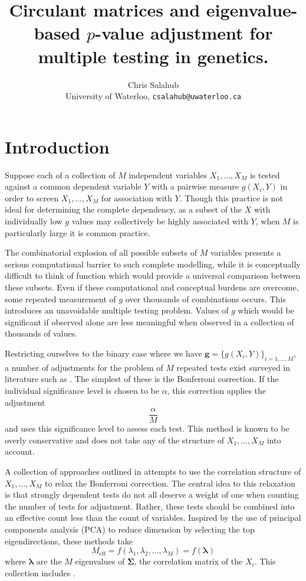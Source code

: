 \documentclass[letterpaper,12pt,oneside,final]{article}
\title{Circulant matrices and eigenvalue-based $p$-value adjustment for multiple testing in genetics.}
\author{Chris Salahub \\ {\footnotesize University of Waterloo, \texttt{csalahub@uwaterloo.ca}}}
\newcommand{\ve}[1]{\mathbf{#1}}           %
\newcommand{\sv}[1]{\boldsymbol{#1}}   %
\newcommand{\sm}[1]{\boldsymbol{#1}}   %
\begin{document}
\maketitle

\section{Introduction}

Suppose each of a collection of $M$ independent variables $X_1, \dots, X_M$ is tested against a common dependent variable $Y$ with a pairwise measure $g(X_i, Y)$ in order to screen $X_1, \dots, X_M$ for association with $Y$. Though this practice is not ideal for determining the complete dependency, as a subset of the $X$ with individually low $g$ values may collectively be highly associated with $Y$, when $M$ is particularly large it is common practice.

The combinatorial explosion of all possible subsets of $M$ variables presents a serious computational barrier to such complete modelling, while it is conceptually difficult to think of function which would provide a universal comparison between these subsets. Even if these computational and conceptual burdens are overcome, some repeated measurement of $g$ over thousands of combinations occurs. This introduces an unavoidable multiple testing problem. Values of $g$ which would be significant if observed alone are less meaningful when observed in a collection of thousands of values.

Restricting ourselves to the binary case where we have $\ve{g} = \{g(X_i, Y)\}_{i = 1, \dots, M}$, a number of adjustments for the problem of $M$ repeated tests exist surveyed in literature such as \cite{cousins2008pooling, cinarviechtbauer2022poolr}. The simplest of these is the Bonferroni correction. If the individual significance level is chosen to be $\alpha$, this correction applies the adjustment
$$\frac{\alpha}{M}$$
and uses this significance level to assess each test. This method is known to be overly conservative and does not take any of the structure of $X_1, \dots, X_M$ into account.

A collection of approaches outlined in \cite{cinarviechtbauer2022poolr} attempts to use the correlation structure of $X_1, \dots, X_M$ to relax the Bonferroni correction. The central idea to this relaxation is that strongly dependent tests do not all deserve a weight of one when counting the number of tests for adjustment. Rather, these tests should be combined into an effective count less than the count of variables. Inspired by the use of principal components analysis (PCA) to reduce dimension by selecting the top eigendirections, these methods take
$$M_{\text{eff}} = f(\lambda_1, \lambda_2, \dots, \lambda_M) = f(\sv{\lambda})$$
where $\sv{\lambda}$ are the $M$ eigenvalues of $\sm{\Sigma}$, the correlation matrix of the $X_i$. This collection includes \cite{cheverud2001, nyholt2004, LiJi2005, Galwey2009}.
\end{document}
